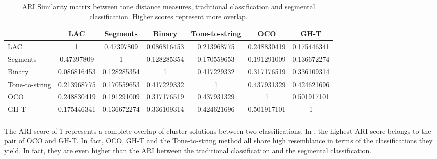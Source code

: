 \documentclass[output=paper, chinesefont]{langscibook}
\begin{document}
%
\begin{table}

\begin{tabular}{lS[table-format=1.2,round-mode=places,round-precision=2] S[table-format=1.2,round-mode=places,round-precision=2] S[table-format=1.2,round-mode=places,round-precision=2] S[table-format=1.2,round-mode=places,round-precision=2] S[table-format=1.2,round-mode=places,round-precision=2] S[table-format=1.2,round-mode=places,round-precision=2] }
\lsptoprule
 & {LAC}& {Segments}& {Binary}& {Tone-to-string}& {OCO}& {GH-T}\\
\midrule
 LAC & 1 & 0.47397809 & 0.086816453 & 0.213968775 & 0.248830419 & 0.175446341\\
Segments & 0.47397809 & 1 & 0.128285354 & 0.170559653 & 0.191291009 & 0.136672274\\
Binary & 0.086816453 & 0.128285354 & 1 & 0.417229332 & 0.317176519 & 0.336109314\\
Tone-to-string & 0.213968775 & 0.170559653 & 0.417229332 & 1 & 0.437931329 & 0.424621696\\
OCO & 0.248830419 & 0.191291009 & 0.317176519 & 0.437931329 & 1 & 0.501917101\\
GH-T & 0.175446341 & 0.136672274 & 0.336109314 & 0.424621696 & 0.501917101 & 1\\
\lspbottomrule
\end{tabular}
\caption{ARI Similarity matrix between tone distance measures, traditional classification and segmental classification. Higher scores represent more overlap.}
\label{tab:sung:10}
\end{table}

The ARI score of 1 represents a complete overlap of cluster solutions between two classifications. In , the highest ARI score belongs to the pair of OCO and GH-T. In fact, OCO, GH-T and the Tone-to-string method all share high resemblance in terms of the classifications they yield. In fact, they are even higher than the ARI between the traditional classification and the segmental classification.
\end{document}
